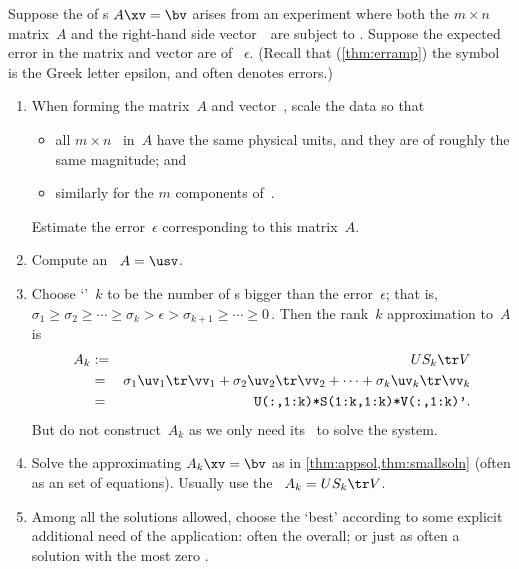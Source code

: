 \begin{procedure} \label{pro:appmat}
Suppose the  of s \(A\xv=\bv\) arises from an experiment where both the \(m\times n\) matrix~\(A\) and the right-hand side vector~\bv\ are subject to .  
Suppose the expected error in the matrix and vector  are of ~\(\epsilon\).
(Recall that (\cref{thm:erramp}) the symbol~\idx{$\epsilon$} is the Greek letter epsilon, and often denotes errors.)

\begin{enumerate}
\item When forming the matrix~\(A\) and vector~\bv, scale the data so that 
\begin{itemize}
\item all \(m\times n\)~ in~\(A\) have the same physical units, and they are of roughly the same magnitude; and
\item similarly for the \(m\) components of~\bv.
\end{itemize}
Estimate the error~\(\epsilon\) corresponding to this matrix~\(A\).
 
\item Compute an \svd\ \(A=\usv\).

\item Choose `'~\(k\) to be the number of s bigger than the error~\(\epsilon\); that is, \(\sigma_1\geq \sigma_2\geq\cdots \geq \sigma_k>\epsilon>\sigma_{k+1}\geq \cdots\geq 0\)\,.
Then the rank~\(k\) approximation to~\(A\) is
\begin{eqnarray*}
A_k&:=&US_k\tr V
\\&=&\sigma_1\uv_1\tr\vv_1+\sigma_2\uv_2\tr\vv_2+\cdots+\sigma_k\uv_k\tr\vv_k
\\&=&\verb|U(:,1:k)*S(1:k,1:k)*V(:,1:k)'|.
\end{eqnarray*}
But do not construct~\(A_k\) as we only need its \svd\ to solve the system.

\item Solve the approximating  \(A_k\xv=\bv\) as 
in \cref{thm:appsol,thm:smallsoln} (often as an 
 set of equations).
Usually use the \svd\ \(A_k=US_k\tr V\).

\item Among all the solutions allowed, choose the `best' according to some explicit additional need of the application: often the  overall; or just as often a solution with the most zero .
\end{enumerate}
\end{procedure}


